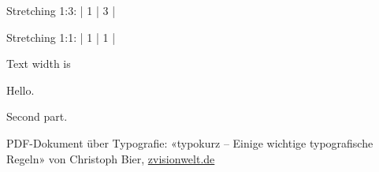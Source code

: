\documentclass[draft]{article}
\begin{document}
Stretching 1:3: |  1  |  3  |

Stretching 1:1: | \hfill 1 \hfill | \hfill 1 \hfill |

\newsavebox{\myBox}

\newlength{\imgW}
\settowidth{\imgW}{\usebox{\myBox}}

Text width is \the\imgW


\noindent
\setlength{\fboxsep}{0pt}

\noindent
{}

\noindent
\begin{minipage}{\textwidth}
 \parbox{.2\textwidth}{Hello.}
 \parbox{\dimexpr \textwidth-.2\textwidth}{Second part.}
\end{minipage}


\noindent
\begin{minipage}{\textwidth}
 \parbox[t]{1.2cm}{  }
 \parbox[t]{\dimexpr \textwidth-1.2cm}{PDF-Dokument über Typografie: «typokurz -- Einige wichtige typografische Regeln» von Christoph Bier, \href{http://www.zvisionwelt.de}{zvisionwelt.de} }
\end{minipage}
\end{document}
